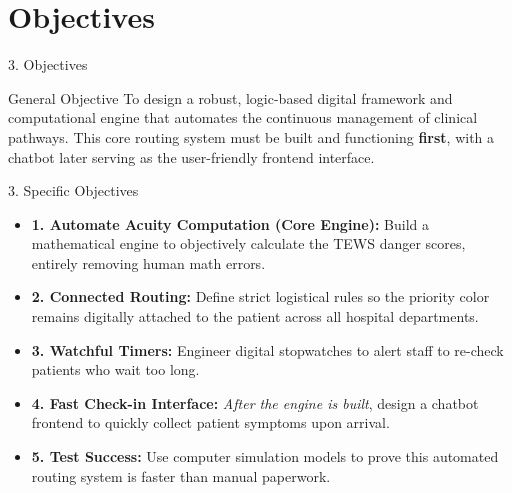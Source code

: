 \documentclass[11pt, aspectratio=169]{beamer}
\begin{document}
	\section{Objectives}
	\begin{frame}{3. Objectives}
		\begin{block}{General Objective}
			To design a robust, logic-based digital framework and computational engine that automates the continuous management of clinical pathways. This core routing system must be built and functioning \textbf{first}, with a chatbot later serving as the user-friendly frontend interface.
		\end{block}
	\end{frame}
	
	\begin{frame}{3. Specific Objectives}
		\begin{itemize}
			\item \textbf{1. Automate Acuity Computation (Core Engine):} Build a mathematical engine to objectively calculate the TEWS danger scores, entirely removing human math errors.
			\item \textbf{2. Connected Routing:} Define strict logistical rules so the priority color remains digitally attached to the patient across all hospital departments.
			\item \textbf{3. Watchful Timers:} Engineer digital stopwatches to alert staff to re-check patients who wait too long.
			\item \textbf{4. Fast Check-in Interface:} \textit{After the engine is built}, design a chatbot frontend to quickly collect patient symptoms upon arrival.
			\item \textbf{5. Test Success:} Use computer simulation models to prove this automated routing system is faster than manual paperwork.
		\end{itemize}
	\end{frame}
	
\end{document}
